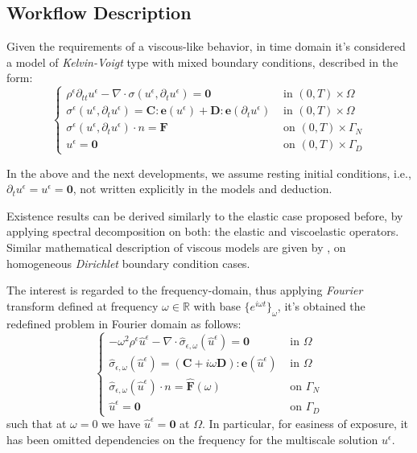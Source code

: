 \subsection{Workflow Description}
Given the requirements of a viscous-like behavior, in time domain it's considered a model of \textit{Kelvin-Voigt} type with mixed boundary conditions, described in the form:
\begin{equation*}
    \left \{
    \begin{array}{cc}
        \rho^{\epsilon}\partial_{tt}u^{\epsilon} - \nabla \cdot \sigma(u^{\epsilon}, \partial_t u^{\epsilon}) = \mathbf{0} & \text{ in } (0,T) \times \Omega\\
        \sigma^{\epsilon}(u^{\epsilon},\partial_t u^{\epsilon})  = \mathbf{C}:\mathbf{e}(u^{\epsilon}) + \mathbf{D}:\mathbf{e}(\partial_t u^{\epsilon}) & \text{ in } (0,T) \times \Omega\\
        \sigma^{\epsilon}(u^{\epsilon}, \partial_t u^{\epsilon})\cdot n = \mathbf{F} & \text{ on } (0,T) \times \Gamma_N\\ 
        u^{\epsilon} = \mathbf{0} & \text{ on } (0,T) \times \Gamma_D
    \end{array}
    \right .
    \label{ViscoElasticModel}
\end{equation*}
\begin{rem}
In the above and the next developments, we assume resting initial conditions, i.e., $\partial_t u^{\epsilon} = u^{\epsilon} = \mathbf{0}$, not written explicitly in the models and deduction.
\end{rem}
Existence results can be derived similarly to the elastic case proposed before, by applying spectral decomposition on both: the elastic and viscoelastic operators. Similar mathematical description of viscous models are given by \cite{Abdessamad2009}, \cite{Boughammoura2013} on homogeneous \textit{Dirichlet} boundary condition cases.

The interest is regarded to the frequency-domain, thus applying \textit{Fourier} transform defined at frequency $\omega \in \mathbb{R}$ with base $\{e^{i\omega t}\}_{\omega}$, it's obtained the redefined problem in Fourier domain as follows:
\begin{equation*}
    \left \{
    \begin{array}{cc}
        -\omega^2 \rho^{\epsilon} \hat{u}^{\epsilon} - \nabla \cdot \hat{\sigma}_{\epsilon,\omega}(\hat{u}^{\epsilon}) = \mathbf{0} & \text{ in } \Omega  \\
        \hat{\sigma}_{\epsilon,\omega} (\hat{u}^{\epsilon}) = (\mathbf{C} + i\omega \mathbf{D}):\mathbf{e}(\hat{u}^{\epsilon}) & \text{ in } \Omega \\
        \hat{\sigma}_{\epsilon,\omega} (\hat{u}^{\epsilon}) \cdot n = \hat{\mathbf{F}}(\omega) & \text{ on } \Gamma_N \\
        \hat{u}^{\epsilon} = \mathbf{0} & \text{ on } \Gamma_D
    \end{array}
    \right .
\end{equation*}
such that at $\omega = 0$ we have $\hat{u}^{\epsilon}=\mathbf{0}$ at $\Omega$. In particular, for easiness of exposure, it has been omitted dependencies on the frequency for the multiscale solution $u^{\epsilon}$.\\

